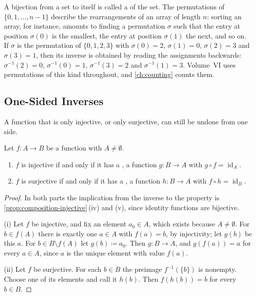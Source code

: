 A bijection from a set to itself is called a  of the set. The permutations of $\{0,1,\ldots,n-1\}$ describe the rearrangements of an array of length $n$: sorting an array, for instance, amounts to finding a permutation $\sigma$ such that the entry at position $\sigma(0)$ is the smallest, the entry at position $\sigma(1)$ the next, and so on. If $\sigma$ is the permutation of $\{0,1,2,3\}$ with $\sigma(0)=2$, $\sigma(1)=0$, $\sigma(2)=3$ and $\sigma(3)=1$, then its inverse is obtained by reading the assignments backwards: $\sigma^{-1}(2)=0$, $\sigma^{-1}(0)=1$, $\sigma^{-1}(3)=2$ and $\sigma^{-1}(1)=3$. Volume~VI uses permutations of this kind throughout, and \cref{ch:counting} counts them.

\subsection{One-Sided Inverses}

A function that is only injective, or only surjective, can still be undone from one side.

\begin{proposition}
\label{prop:one-sided}
Let $f\colon A\to B$ be a function with $A\ne\emptyset$.
\begin{enumerate}
\item $f$ is injective if and only if it has a , a function $g\colon B\to A$ with $g\circ f=\operatorname{id}_A$.
\item $f$ is surjective if and only if it has a , a function $h\colon B\to A$ with $f\circ h=\operatorname{id}_B$.
\end{enumerate}
\end{proposition}

\begin{proof}
In both parts the implication from the inverse to the property is \cref{prop:composition-injective}\,(iv) and (v), since identity functions are bijective.

(i) Let $f$ be injective, and fix an element $a_0\in A$, which exists because $A\ne\emptyset$. For $b\in f(A)$ there is exactly one $a\in A$ with $f(a)=b$, by injectivity; let $g(b)$ be this $a$. For $b\in B\setminus f(A)$ let $g(b)\coloneqq a_0$. Then $g\colon B\to A$, and $g(f(a))=a$ for every $a\in A$, since $a$ is the unique element with value $f(a)$.

(ii) Let $f$ be surjective. For each $b\in B$ the preimage $f^{-1}(\{b\})$ is nonempty. Choose one of its elements and call it $h(b)$. Then $f(h(b))=b$ for every $b\in B$.
\end{proof}

